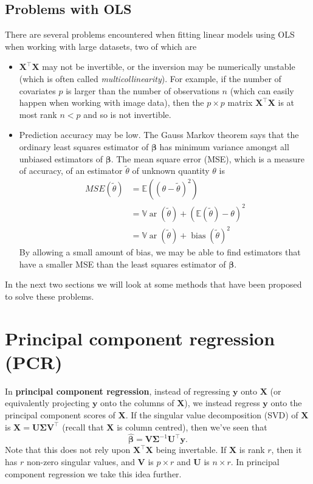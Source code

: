 \documentclass[
]{book}
\theoremstyle{definition}
\theoremstyle{definition}
\theoremstyle{definition}
\theoremstyle{definition}
\theoremstyle{remark}
\begin{document}
\subsection{Problems with OLS}\label{problems-with-ols}

There are several problems encountered when fitting linear models using OLS when working with large datasets, two of which are

\begin{itemize}
\item
  \(\mathbf X^\top \mathbf X\) may not be invertible, or the inversion may be numerically unstable (which is often called \emph{multicollinearity}). For example, if the number of covariates \(p\) is larger than the number of observations \(n\) (which can easily happen when working with image data), then the \(p \times p\) matrix \(\mathbf X^\top \mathbf X\) is at most rank \(n<p\) and so is not invertible.
\item
  Prediction accuracy may be low. The Gauss Markov theorem says that the ordinary least squares estimator of \(\boldsymbol \beta\) has minimum variance amongst all unbiased estimators of \(\boldsymbol \beta\). The mean square error (MSE), which is a measure of accuracy, of an estimator \(\tilde{\theta}\) of unknown quantity \(\theta\) is
  \begin{align*}
  MSE(\tilde{\theta}) &= {\mathbb{E}}((\theta - \tilde{\theta})^2)\\
  &={\mathbb{V}\operatorname{ar}}(\tilde{\theta})+ ({\mathbb{E}}(\tilde{\theta})- \theta)^2\\
  &={\mathbb{V}\operatorname{ar}}(\tilde{\theta})+ \operatorname{bias}(\tilde{\theta})^2
  \end{align*}
  By allowing a small amount of bias, we may be able to find estimators that have a smaller MSE than the least squares estimator of \(\boldsymbol \beta\).
\end{itemize}

In the next two sections we will look at some methods that have been proposed to solve these problems.

\section{Principal component regression (PCR)}\label{principal-component-regression-pcr}

In \textbf{principal component regression}, instead of regressing \(\mathbf y\) onto \(\mathbf X\) (or equivalently projecting \(\mathbf y\) onto the columns of \(\mathbf X\)), we instead regress \(\mathbf y\) onto the principal component scores of \(\mathbf X\).
If the singular value decomposition (SVD) of \(\mathbf X\) is \(\mathbf X= \mathbf U\boldsymbol{\Sigma}\mathbf V^\top\) (recall that \(\mathbf X\) is column centred), then we've seen that
\[\hat{\boldsymbol \beta}= \mathbf V\boldsymbol{\Sigma}^{-1}\mathbf U^\top \mathbf y.\]
Note that this does not rely upon \(\mathbf X^\top\mathbf X\) being invertable. If \(\mathbf X\) is rank \(r\), then it has \(r\) non-zero singular values, and \(\mathbf V\) is \(p\times r\) and \(\mathbf U\) is \(n \times r\). In principal component regression we take this idea further.
\end{document}
